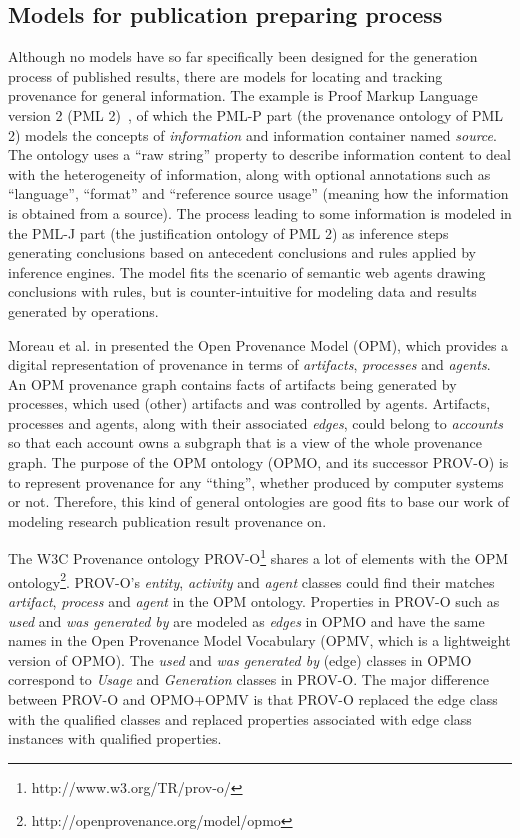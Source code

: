 

\subsection{Models for publication preparing process}
Although no models have so far specifically been designed for the generation process of published results, there are models for locating and tracking provenance for general information. The example is Proof Markup Language version 2 (PML 2)~\cite{mcguinness2007pml}, of which the PML-P part (the provenance ontology of PML 2) models the concepts of \emph{information} and information container named \emph{source}. The ontology uses a ``raw string'' property to describe information content to deal with the heterogeneity of information, along with optional annotations such as ``language'', ``format'' and ``reference source usage'' (meaning how the information is obtained from a source). The process leading to some information is modeled in the PML-J part (the justification ontology of PML 2) as inference steps generating conclusions based on antecedent conclusions and rules applied by inference engines. The model fits the scenario of semantic web agents drawing conclusions with rules, but is counter-intuitive for modeling data and results generated by operations.

Moreau et al. in \cite{moreau2011open} presented the Open Provenance Model (OPM), which provides a digital representation of provenance in terms of \emph{artifacts}, \emph{processes} and \emph{agents}. An OPM provenance graph contains facts of artifacts being generated by processes, which used (other) artifacts and was controlled by agents. Artifacts, processes and agents, along with their associated \emph{edges}, could belong to \emph{accounts} so that each account owns a subgraph that is a view of the whole provenance graph. The purpose of the OPM ontology (OPMO, and its successor PROV-O) is to represent provenance for any ``thing'', whether produced by computer systems or not. Therefore, this kind of general ontologies are good fits to base our work of modeling research publication result provenance on.

The W3C Provenance ontology PROV-O\footnote{http://www.w3.org/TR/prov-o/} shares a lot of elements with the OPM ontology\footnote{http://openprovenance.org/model/opmo}. PROV-O's \emph{entity}, \emph{activity} and \emph{agent} classes could find their matches \emph{artifact}, \emph{process} and \emph{agent} in the OPM ontology. Properties in PROV-O such as \emph{used} and \emph{was generated by} are modeled as \emph{edges} in OPMO and have the same names in the Open Provenance Model Vocabulary (OPMV, which is a lightweight version of OPMO). The \emph{used} and \emph{was generated by} (edge) classes in OPMO correspond to \emph{Usage} and \emph{Generation} classes in PROV-O. The major difference between PROV-O and OPMO+OPMV is that PROV-O replaced the edge class with the qualified classes and replaced properties associated with edge class instances with qualified properties. 

